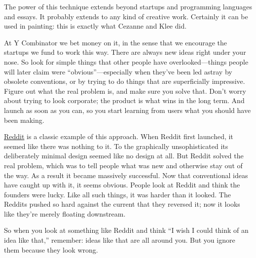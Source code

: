 The power of this technique extends beyond startups and programming
languages and essays. It probably extends to any kind of creative work.
Certainly it can be used in painting: this is exactly what Cezanne and
Klee did.

At Y Combinator we bet money on it, in the sense that we encourage the
startups we fund to work this way. There are always new ideas right
under your nose. So look for simple things that other people have
overlooked---things people will later claim were
``obvious''---especially when they've been led astray by obsolete
conventions, or by trying to do things that are superficially
impressive. Figure out what the real problem is, and make sure you solve
that. Don't worry about trying to look corporate; the product is what
wins in the long term. And launch as soon as you can, so you start
learning from users what you should have been making.

\href{http://reddit.com}{Reddit} is a classic example of this approach.
When Reddit first launched, it seemed like there was nothing to it. To
the graphically unsophisticated its deliberately minimal design seemed
like no design at all. But Reddit solved the real problem, which was to
tell people what was new and otherwise stay out of the way. As a result
it became massively successful. Now that conventional ideas have caught
up with it, it seems obvious. People look at Reddit and think the
founders were lucky. Like all such things, it was harder than it looked.
The Reddits pushed so hard against the current that they reversed it;
now it looks like they're merely floating downstream.

So when you look at something like Reddit and think ``I wish I could
think of an idea like that,'' remember: ideas like that are all around
you. But you ignore them because they look wrong.
